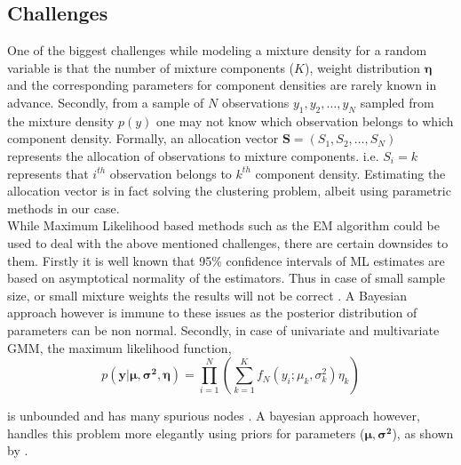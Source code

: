 \subsection{Challenges}
\label{subsec : challenges_mixture_density}
One of the biggest challenges while modeling a mixture density for a random variable is that the number of mixture components ($K$), weight distribution $\boldsymbol{\eta}$ and the corresponding parameters for component densities are rarely known in advance. Secondly, from a sample of $N$ observations $y_1, y_2, \ldots, y_N$ sampled from the mixture density $p(y)$ one may not know which observation belongs to which component density. Formally, an allocation vector $\boldsymbol{S} = (S_1, S_2, \ldots, S_N)$ represents the allocation of observations to mixture components. i.e. $S_i = k$ represents that $i^{th}$ observation belongs to $k^{th}$ component density. Estimating the allocation vector is in fact solving the clustering problem, albeit using parametric methods in our case.\\

While Maximum Likelihood based methods such as the EM algorithm could be used to deal with the above mentioned challenges, there are certain downsides to them. Firstly it is well known that 95\% confidence intervals of ML estimates are based on asymptotical normality of the estimators. Thus in case of small sample size, or small mixture weights the results will not be correct \citep[pg. 35]{fruhwirth-schnatter_finite_2013}. A Bayesian approach however is immune to these issues as the posterior distribution of parameters can be non normal. Secondly, in case of univariate and multivariate GMM, the maximum likelihood function,\\

$$ p(\boldsymbol{y|\mu, \sigma^2, \eta}) = \prod_{i=1}^{N} (\sum_{k=1}^{K} f_N(y_i; \mu_k, \sigma^2_k) \eta_k)$$

is unbounded and has many spurious nodes \citep{kiefer_consistency_1956,day_estimating_1969}. A bayesian approach however, handles this problem more elegantly using priors for parameters ($\boldsymbol{\mu, \sigma^2}$), as shown by \cite[pg. 176]{fruhwirth-schnatter_finite_2013}.

